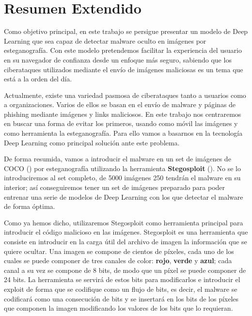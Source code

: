 \chapter{Resumen Extendido}

Como objetivo principal, en este trabajo se persigue presentar un modelo de Deep Learning que sea capaz de detectar malware oculto en imágenes por esteganografía. Con este modelo pretendemos facilitar la experiencia del usuario en su navegador de confianza desde un enfoque más seguro, sabiendo que los ciberataques utilizados mediante el envío de imágenes maliciosas es un tema que está a la orden del día.

Actualmente, existe una variedad pasmosa de ciberataques tanto a usuarios como a organizaciones. Varios de ellos se basan en el envío de malware y páginas de phishing mediante imágenes y links maliciosos. En este trabajo nos centraremos en buscar una forma de evitar los primeros, usando como móvil las imágenes y como herramienta la esteganografía. Para ello vamos a basarnos en la tecnología Deep Learning como principal solución ante este problema.

De forma resumida, vamos a introducir el malware en un set de imágenes de COCO (\cite{coco}) por esteganografía utilizando la herramienta \textbf{Stegosploit} (\cite{stegosploit}). No se lo introduciremos al set completo, de 5000 imágenes 250 tendrán el malware en su interior; así conseguiremos tener un set de imágenes preparado para poder entrenar una serie de modelos de Deep Learning con los que detectar el malware de forma óptima. %

Como ya hemos dicho, utilizaremos Stegosploit como herramienta principal para introducir el código malicioso en las imágenes. Stegosploit es una herramienta que consiste en introducir en la carga útil del archivo de imagen la información que se quiere ocultar. Una imagen se compone de cientos de píxeles, cada uno de los cuales se puede componer de tres canales de color: \textbf{rojo}, \textbf{verde} y \textbf{azul}; cada canal a su vez se compone de 8 bits, de modo que un píxel se puede componer de 24 bits. La herramienta se servirá de estos bits para modificarlos e introducir el exploit de forma que se codifique como un flujo de bits, es decir, el malware se codificará como una consecución de bits y se insertará en los bits de los píxeles que componen la imagen modificando los valores de los bits que lo requieran.

